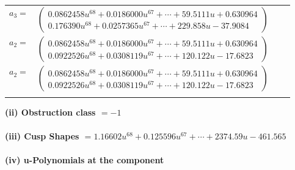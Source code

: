 \documentclass[1p]{elsarticle_modified}
\theoremstyle{definition}
\begin{document}
\begin{tabular}{m{7pt} m{180pt} m{7pt} m{180pt} }
\flushright $a_{3}=$&$\begin{pmatrix}0.0862458 u^{68}+0.0186000 u^{67}+\cdots+59.5111 u+0.630964\\0.176390 u^{68}+0.0257365 u^{67}+\cdots+229.858 u-37.9084\end{pmatrix}$ \\
\flushright $a_{2}=$&$\begin{pmatrix}0.0862458 u^{68}+0.0186000 u^{67}+\cdots+59.5111 u+0.630964\\0.0922526 u^{68}+0.0308119 u^{67}+\cdots+120.122 u-17.6823\end{pmatrix}$\\ \flushright $a_{2}=$&$\begin{pmatrix}0.0862458 u^{68}+0.0186000 u^{67}+\cdots+59.5111 u+0.630964\\0.0922526 u^{68}+0.0308119 u^{67}+\cdots+120.122 u-17.6823\end{pmatrix}$\\&\end{tabular}
\flushleft \textbf{(ii) Obstruction class $= -1$}\\~\\
\flushleft \textbf{(iii) Cusp Shapes $= 1.16602 u^{68}+0.125596 u^{67}+\cdots+2374.59 u-461.565$}\\~\\
\newpage\renewcommand{\arraystretch}{1}
\flushleft \textbf{(iv) u-Polynomials at the component}\newline \\
\end{document}
